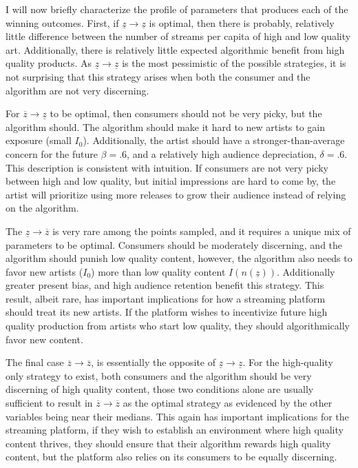 \documentclass[
]{article}
\begin{document}
I will now briefly characterize the profile of parameters that produces
each of the winning outcomes. First, if
\(\underline{z}\to\underline{z}\) is optimal, then there is probably,
relatively little difference between the number of streams per capita of
high and low quality art. Additionally, there is relatively little
expected algorithmic benefit from high quality products. As
\(\underline{z}\to\underline{z}\) is the most pessimistic of the
possible strategies, it is not surprising that this strategy arises when
both the consumer and the algorithm are not very discerning.

For \(\overline{z}\to\underline{z}\) to be optimal, then consumers
should not be very picky, but the algorithm should. The algorithm should
make it hard to new artists to gain exposure (small \(I_0\)).
Additionally, the artist should have a stronger-than-average concern for
the future \(\beta=.6\), and a relatively high audience depreciation,
\(\delta=.6\). This description is consistent with intuition. If
consumers are not very picky between high and low quality, but initial
impressions are hard to come by, the artist will prioritize using more
releases to grow their audience instead of relying on the algorithm.

The \(\underline{z}\to\overline{z}\) is very rare among the points
sampled, and it requires a unique mix of parameters to be optimal.
Consumers should be moderately discerning, and the algorithm should
punish low quality content, however, the algorithm also needs to favor
new artists (\(I_0\)) more than low quality content
\(I(n(\underline z))\). Additionally greater present bias, and high
audience retention benefit this strategy. This result, albeit rare, has
important implications for how a streaming platform should treat its new
artists. If the platform wishes to incentivize future high quality
production from artists who start low quality, they should
algorithmically favor new content.

The final case \(\overline{z}\to\overline{z}\), is essentially the
opposite of \(\underline{z}\to\underline{z}\). For the high-quality only
strategy to exist, both consumers and the algorithm should be very
discerning of high quality content, those two conditions alone are
usually sufficient to result in \(\overline{z}\to\overline{z}\) as the
optimal strategy as evidenced by the other variables being near their
medians. This again has important implications for the streaming
platform, if they wish to establish an environment where high quality
content thrives, they should ensure that their algorithm rewards high
quality content, but the platform also relies on its consumers to be
equally discerning.
\end{document}
